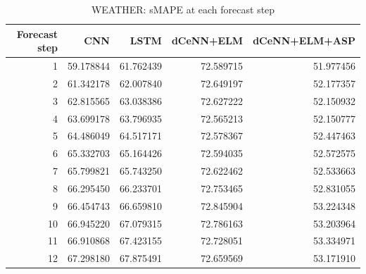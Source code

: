 \begin{table}
\caption{WEATHER: sMAPE at each forecast step}
\begin{tabular}{rrrrr}
\toprule
Forecast step & CNN & LSTM & dCeNN+ELM & dCeNN+ELM+ASP \\
\midrule
1 & 59.178844 & 61.762439 & 72.589715 & 51.977456 \\
2 & 61.342178 & 62.007840 & 72.649197 & 52.177357 \\
3 & 62.815565 & 63.038386 & 72.627222 & 52.150932 \\
4 & 63.699178 & 63.796935 & 72.565213 & 52.150777 \\
5 & 64.486049 & 64.517171 & 72.578367 & 52.447463 \\
6 & 65.332703 & 65.164426 & 72.594035 & 52.572575 \\
7 & 65.799821 & 65.743250 & 72.622462 & 52.533663 \\
8 & 66.295450 & 66.233701 & 72.753465 & 52.831055 \\
9 & 66.454743 & 66.659810 & 72.845904 & 53.224348 \\
10 & 66.945220 & 67.079315 & 72.786163 & 53.203964 \\
11 & 66.910868 & 67.423155 & 72.728051 & 53.334971 \\
12 & 67.298180 & 67.875491 & 72.659569 & 53.171910 \\
\bottomrule
\end{tabular}
\end{table}
